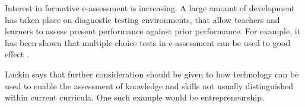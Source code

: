     Interest in formative e-assessment is increasing. A large amount of development has taken place on diagnostic testing environments, that allow teachers and learners to assess present performance against prior performance. \citep{luckin} For example, it has been shown that multiple-choice tests in e-assessment can be used to good effect \citep{nicol}.


    Luckin says that further consideration should  be given to how technology can be used to enable the assessment of knowledge and skills not usually distinguished within current curricula. \citep{luckin} One such example would be entrepreneurship.

    
